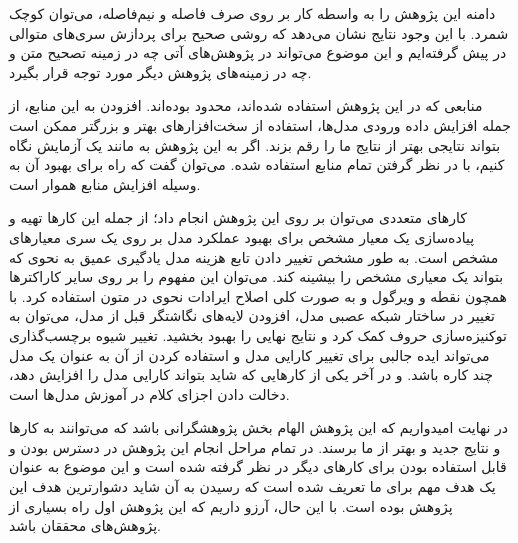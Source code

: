 دامنه این پژوهش را به واسطه کار بر روی صرف فاصله و نیم‌فاصله، می‌توان کوچک شمرد. با این وجود نتایج نشان می‌دهد که روشی صحیح برای پردازش سری‌های متوالی در پیش گرفته‌ایم و این موضوع می‌تواند در پژوهش‌های آتی چه در زمینه تصحیح متن و چه در زمینه‌های پژوهش دیگر مورد توجه قرار بگیرد.


منابعی که در این پژوهش استفاده شده‌اند، محدود بوده‌اند. افزودن به این منابع، از جمله افزایش داده ورودی مدل‌ها، استفاده از سخت‌افزارهای بهتر و بزرگتر ممکن است بتواند نتایجی بهتر از نتایج ما را رقم بزند. اگر به این پژوهش به مانند یک آزمایش نگاه کنیم، با در نظر گرفتن تمام منابع استفاده شده. می‌توان گفت که راه برای بهبود آن به وسیله افزایش منابع هموار است.


کارهای متعددی می‌توان بر روی این پژوهش انجام داد؛ از جمله این کارها تهیه و پیاده‌سازی یک معیار مشخص برای بهبود عملکرد مدل بر روی یک سری معیارهای مشخص است. به طور مشخص تغییر دادن تابع هزینه مدل یادگیری عمیق به نحوی که بتواند یک معیاری مشخص را بیشینه کند. می‌توان این مفهوم را بر روی سایر کاراکترها همچون نقطه و ویرگول و به صورت کلی اصلاح ایرادات نحوی در متون استفاده کرد. با تغییر در ساختار شبکه عصبی مدل، افزودن لایه‌های نگاشتگر قبل از مدل، می‌توان به توکنیزه‌سازی حروف کمک کرد و نتایج نهایی را بهبود بخشید. تغییر شیوه برچسب‌گذاری می‌تواند ایده جالبی برای تغییر کارایی مدل و استفاده کردن از آن به عنوان یک مدل چند کاره باشد. و در آخر یکی از کارهایی که شاید بتواند کارایی مدل را افزایش دهد، دخالت دادن اجزای کلام در آموزش مدل‌ها است.


در نهایت امیدواریم که این پژوهش الهام بخش پژوهشگرانی باشد که می‌توانند به کارها و نتایج جدید و بهتر از ما برسند. در تمام مراحل انجام این پژوهش در دسترس بودن و قابل استفاده بودن برای کارهای دیگر در نظر گرفته شده است و این موضوع به عنوان یک هدف مهم برای ما تعریف شده است که رسیدن به آن شاید دشوارترین هدف این پژوهش بوده است. با این حال، آرزو داریم که این پژوهش اول راه بسیاری از پژوهش‌های محققان باشد.
